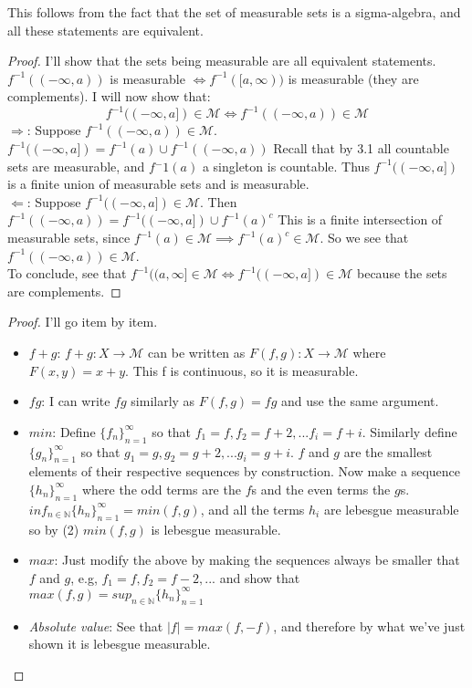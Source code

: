 \documentclass[12pt]{article}
\newenvironment{problem}[2][Problem]{\begin{trivlist}
\item[\hskip \labelsep {\bfseries #1}\hskip \labelsep {\bfseries #2.}]}{\end{trivlist}}
\theoremstyle{definition}
\theoremstyle{definition}
\theoremstyle{definition}
\theoremstyle{definition}
\begin{document}
\begin{problem}{3.4}
This follows from the fact that the set of measurable sets is a sigma-algebra, and all these statements are equivalent.
\begin{proof}
I'll show that the sets being measurable are all equivalent statements. \\
$f^{-1}((-\infty, a))$ is measurable $\iff f^{-1}([a, \infty))$ is measurable (they are complements). I will now show that: 
$$ f^{-1}((-\infty, a]) \in \mathcal{M} \iff f^{-1}((-\infty, a)) \in \mathcal{M} $$
$\Rightarrow$: Suppose $f^{-1}((-\infty, a)) \in \mathcal{M}$. $f^{-1}((-\infty, a]) = f^{-1}(a) \cup f^{-1}((-\infty, a))$ Recall that by 3.1 all countable sets are measurable, and $f{^-1}(a)$ a singleton is countable. Thus $f^{-1}((-\infty, a])$ is a finite union of measurable sets and is measurable. \\
$\Leftarrow$: Suppose $f^{-1}((-\infty, a]) \in \mathcal{M}$. Then $f^{-1}((-\infty, a)) = f^{-1}((-\infty, a]) \cup f^{-1}(a)^c $ This is a finite intersection of measurable sets, since $f^{-1}(a) \in \mathcal{M} \implies f^{-1}(a)^c \in \mathcal{M}$. So we see that $f^{-1}((-\infty, a)) \in \mathcal{M}$. \\
To conclude, see that $f^{-1}((a, \infty] \in \mathcal{M} \iff f^{-1}((-\infty, a]) \in \mathcal{M}$ because the sets are complements.
\end{proof} 
\end{problem}

\begin{problem}{3.7}
\begin{proof} I'll go item by item.
\begin{itemize}
\item $f+g$: $f+g: X \to \mathcal{M}$ can be written as $F(f , g): X \to \mathcal{M}$ where $F(x, y) = x + y$. This f is continuous, so it is measurable. 
\item $fg$: I can write $fg$ similarly as $F(f, g) = fg$ and use the same argument.
\item $min$: Define $\{f_n\}_{n=1}^\infty$ so that $f_1 = f, f_2 = f+2,... f_i = f+i$. Similarly define $\{g_n\}_{n=1}^\infty$ so that $g_1 = g, g_2 = g+2,... g_i = g+i$. $f$ and $g$ are the smallest elements of their respective sequences by construction. Now make a sequence $\{h_n\}_{n=1}^\infty$ where the odd terms are the $f$s and the even terms the $g$s. $inf_{n\in\mathbb{N}}\{h_n\}_{n=1}^\infty = min(f, g)$, and all the terms $h_i$ are lebesgue measurable so by (2) $min(f, g)$ is lebesgue measurable.
\item $max$: Just modify the above by making the sequences always be smaller that $f$ and $g$, e.g, $f_1 = f, f_2 = f - 2, ...$ and show that $max(f, g) = sup_{n\in\mathbb{N}}\{h_n\}_{n=1}^\infty$
\item \textit{Absolute value}: See that $|f| = max(f, -f)$, and therefore by what we've just shown it is lebesgue measurable.
\end{itemize}
\end{proof}
\end{problem}
\end{document}
